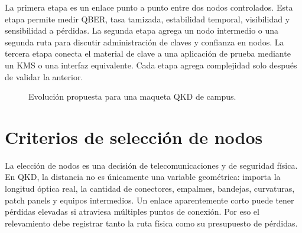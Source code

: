 La primera etapa es un enlace punto a punto entre dos nodos controlados. Esta etapa permite medir QBER, tasa tamizada, estabilidad temporal, visibilidad y sensibilidad a pérdidas. La segunda etapa agrega un nodo intermedio o una segunda ruta para discutir administración de claves y confianza en nodos. La tercera etapa conecta el material de clave a una aplicación de prueba mediante un KMS o una interfaz equivalente. Cada etapa agrega complejidad solo después de validar la anterior.

\begin{figure}[H]
  \centering
  \caption{Evolución propuesta para una maqueta QKD de campus.}
  \label{fig:etapas_campus}
\end{figure}

\section{Criterios de selección de nodos}

La elección de nodos es una decisión de telecomunicaciones y de seguridad física. En QKD, la distancia no es únicamente una variable geométrica: importa la longitud óptica real, la cantidad de conectores, empalmes, bandejas, curvaturas, patch panels y equipos intermedios. Un enlace aparentemente corto puede tener pérdidas elevadas si atraviesa múltiples puntos de conexión. Por eso el relevamiento debe registrar tanto la ruta física como su presupuesto de pérdidas.

